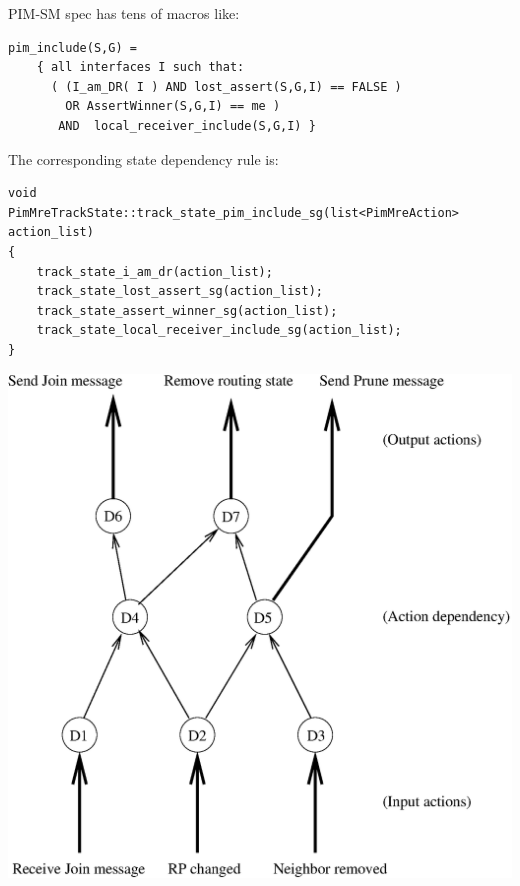 \documentclass[landscape]{icsislides}
\begin{document}
\begin{slide}

PIM-SM spec has tens of macros like:

\begin{small}
\begin{verbatim}
pim_include(S,G) =
    { all interfaces I such that:
      ( (I_am_DR( I ) AND lost_assert(S,G,I) == FALSE )
        OR AssertWinner(S,G,I) == me )
       AND  local_receiver_include(S,G,I) }
\end{verbatim}
\end{small}

The corresponding state dependency rule is:
\begin{small}
\begin{verbatim}
void
PimMreTrackState::track_state_pim_include_sg(list<PimMreAction> action_list)
{
    track_state_i_am_dr(action_list);
    track_state_lost_assert_sg(action_list);
    track_state_assert_winner_sg(action_list);
    track_state_local_receiver_include_sg(action_list);
}
\end{verbatim}
\end{small}

\end{slide}

\begin{slide}

\begin{center}
  \includegraphics[scale=0.55]{figs/pim_state_dependency}
\end{center}

\end{slide}
\end{document}
